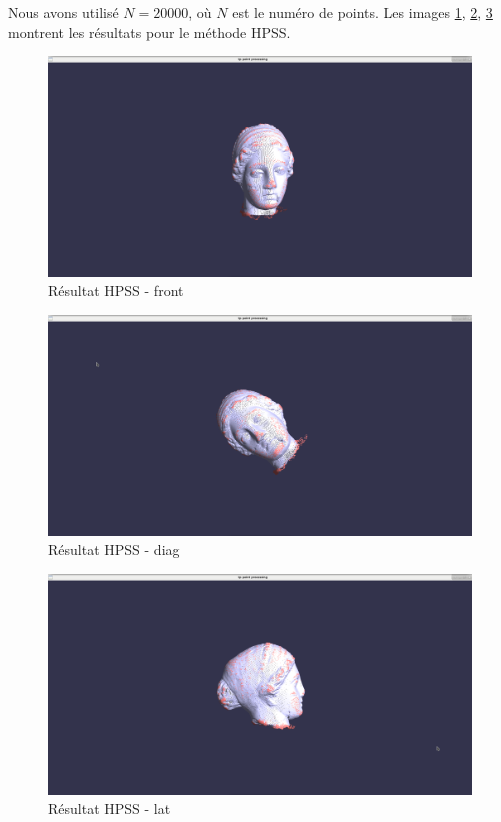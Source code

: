 \documentclass[a4,12pt]{report}
\begin{document}
Nous avons utilisé $N=20000$, où $N$ est le numéro de points. Les images \ref{fig:1}, \ref{fig:2}, \ref{fig:3} montrent les résultats pour le méthode HPSS.
\begin{figure}[!h]
	\includegraphics[width=\linewidth]{figs/primeiro_casp.png}
	\caption{Résultat HPSS - front}
	\label{fig:1}
\end{figure}
\begin{figure}[!h]
	\includegraphics[width=\linewidth]{figs/primeiro_caso_diag.png}
	\caption{Résultat HPSS - diag}
	\label{fig:2}
\end{figure}
\begin{figure}[!h]
	\includegraphics[width=\linewidth]{figs/primeiro_caso_lat.png}
	\caption{Résultat HPSS - lat}
	\label{fig:3}
\end{figure}
\end{document}
